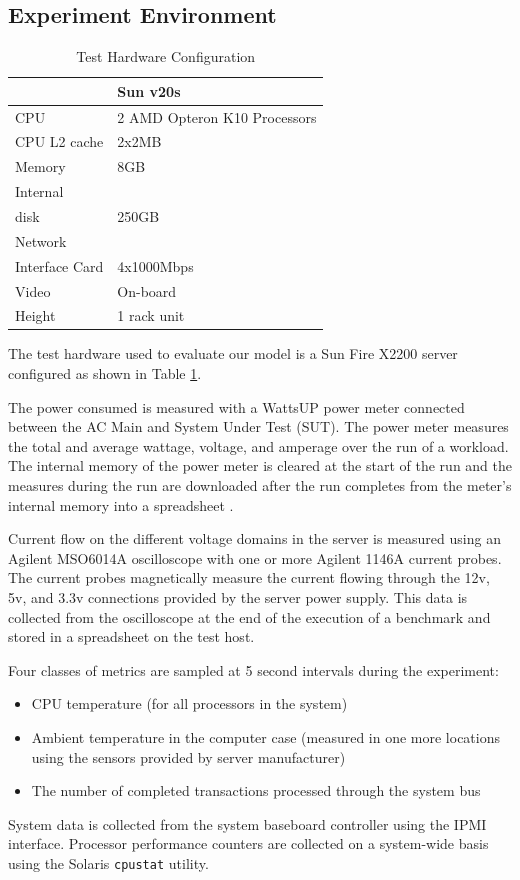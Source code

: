 \documentclass[times, 10pt,onecolumn]{article}
\begin{document}
\subsection{Experiment Environment}
\label{sec:expdesign}
\begin{table}
  \centering
  \label{tab:hardware}
  \begin{tabular}{l|l}
    \hline
    &\textbf{Sun v20s}\\  
    \hline 
    CPU&2 AMD Opteron K10 Processors\\
    \hline 
    CPU L2 cache&2x2MB\\
    \hline 
    Memory&8GB\\
    \hline 
    Internal\\disk&250GB\\
    \hline 
    Network\\ Interface Card&4x1000Mbps\\
    \hline 
    Video&On-board \\
    \hline 
    Height&1 rack unit\\
    \hline
  \end{tabular}
  \caption{Test Hardware Configuration}
\end{table}
The test hardware used to evaluate our model is a Sun Fire X2200 server
configured as shown in Table \ref{tab:hardware}.

The power consumed is measured with a WattsUP \cite{WattsUp2006a} power
meter connected between the AC Main and System Under Test (SUT).
The power meter measures the total and average wattage, voltage, and
amperage over the run of a workload.  The internal memory of the power
meter is cleared at the start of the run and the measures during the run
are downloaded after the run completes from the meter's internal memory
into a spreadsheet \cite{WattsUp2006b}.

Current flow on the different voltage domains in the server is measured
using an Agilent MSO6014A oscilloscope with one or more Agilent 1146A current
probes.  The current probes magnetically measure the current flowing
through the 12v, 5v, and 3.3v connections provided by the server power
supply.  This data is collected from the oscilloscope at the end of the
execution of a benchmark and stored in a spreadsheet on the test host.

Four classes of metrics are sampled at 5 second intervals during the
experiment:
\begin{itemize}
\item CPU temperature (for all processors in the system)
\item Ambient temperature in the computer case (measured in one more
  locations using the sensors provided by server manufacturer)
\item The number of completed transactions processed through the system bus
\end{itemize}
System data is collected from the system baseboard controller using the
IPMI interface. Processor performance counters are collected on a
system-wide basis using the Solaris \texttt{cpustat} utility.
\end{document}
